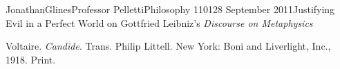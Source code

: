 \documentclass[12pt, letterpaper]{article}
\begin{document}
\begin{mla}{Jonathan}{Glines}{Professor Pelletti}{Philosophy 1101}{28 September 2011}{Justifying Evil in a Perfect World on Gottfried Leibniz's \textit{Discourse on Metaphysics}}

%
%
%
%
%
%
%
%
%

\begin{workscited}

\bibent
Voltaire.  \textit{Candide}.  Trans. Philip Littell.  New York: Boni and Liverlight, Inc., 1918.  Print.

\end{workscited}
\end{mla}
\end{document}
